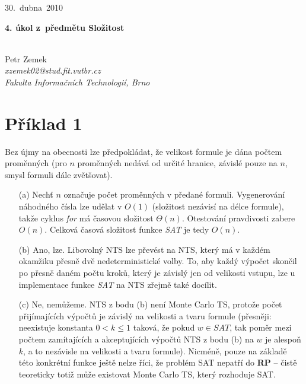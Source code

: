 \documentclass[10pt,a4paper]{article}
\begin{document}
\thispagestyle{empty}
\pagestyle{empty}

\begin{flushright}
	30.~dubna~2010
\end{flushright}

\begin{center}
	\begin{large}\textbf{4. úkol z~předmětu Složitost}\end{large} \\
	\vspace{0.4cm}
	Petr Zemek \\
	\textit{xzemek02@stud.fit.vutbr.cz} \\
	\textit{Fakulta Informačních Technologií, Brno} \\
\end{center}

\section*{Příklad 1}

Bez újmy na obecnosti lze předpokládat, že velikost formule je dána počtem proměnných (pro $n$ proměnných nedává od určité hranice, závislé pouze na $n$, smysl formuli dále zvětšovat).

\begin{enumerate}
	\item[(a)] Nechť $n$ označuje počet proměnných v předané formuli. Vygenerování náhodného čísla lze udělat v $O(1)$ (složitost nezávisí na délce formule), takže cyklus \emph{for} má časovou složitost $\Theta(n)$. Otestování pravdivosti zabere $O(n)$. Celková časová složitost funkce \emph{SAT} je tedy $O(n)$.

	\item[(b)] Ano, lze. Libovolný NTS lze převést na NTS, který má v každém okamžiku přesně dvě nedeterministické volby. To, aby každý výpočet skončil po přesně daném počtu kroků, který je závislý jen od velikosti vstupu, lze u implementace funkce \emph{SAT} na NTS zřejmě také docílit.

	\item[(c)] Ne, nemůžeme. NTS z bodu (b) není Monte Carlo TS, protože počet přijímajících výpočtů je závislý na velikosti a tvaru formule (přesněji: neexistuje konstanta $0 < k \leq 1$ taková, že pokud $w \in SAT$, tak poměr mezi počtem zamítajících a akceptujících výpočtů NTS z bodu (b) na $w$ je alespoň $k$, a to nezávisle na velikosti a tvaru formule). Nicméně, pouze na základě této konkrétní funkce ještě nelze říci, že problém SAT nepatří do \textbf{RP} -- čistě teoreticky totiž může existovat Monte Carlo TS, který rozhoduje SAT.
\end{enumerate}
\end{document}
